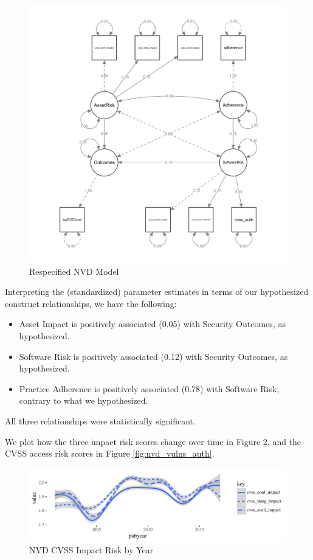 \begin{figure}
	\centering
	\includegraphics[width=.6\textwidth]{NVD_Respecified_SEM_Model.pdf}
	\caption{Respecified NVD Model}
	\label{fig:nvd_model_respecified_estimates}
\end{figure}

Interpreting the (standardized) parameter estimates in terms of our hypothesized construct relationships, we have the following:
\begin{itemize}
	\item  Asset Impact is positively associated (0.05) with Security Outcomes, as hypothesized.
	\item Software Risk is positively associated (0.12) with Security Outcomes, as hypothesized. 
	\item Practice Adherence is positively associated (0.78) with Software Risk, contrary to what we hypothesized. 
\end{itemize}	
All three relationships were statistically significant. 

We plot how the three impact risk scores change over time in Figure \ref{fig:nvd_vulns_impact}, and the CVSS access risk scores in Figure \ref{fig:nvd_vulns_auth}. 	
		
\begin{figure}
	\centering
	\includegraphics[width=\columnwidth]{nvd_cvss_impact}
	\caption{NVD CVSS Impact Risk by Year}
	\label{fig:nvd_vulns_impact}
\end{figure}

